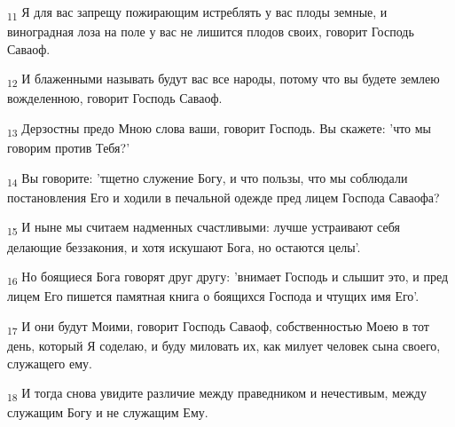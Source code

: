 \begin{tcolorbox}
\textsubscript{11} Я для вас запрещу пожирающим истреблять у вас плоды земные, и виноградная лоза на поле у вас не лишится плодов своих, говорит Господь Саваоф.
\end{tcolorbox}
\begin{tcolorbox}
\textsubscript{12} И блаженными называть будут вас все народы, потому что вы будете землею вожделенною, говорит Господь Саваоф.
\end{tcolorbox}
\begin{tcolorbox}
\textsubscript{13} Дерзостны предо Мною слова ваши, говорит Господь. Вы скажете: 'что мы говорим против Тебя?'
\end{tcolorbox}
\begin{tcolorbox}
\textsubscript{14} Вы говорите: 'тщетно служение Богу, и что пользы, что мы соблюдали постановления Его и ходили в печальной одежде пред лицем Господа Саваофа?
\end{tcolorbox}
\begin{tcolorbox}
\textsubscript{15} И ныне мы считаем надменных счастливыми: лучше устраивают себя делающие беззакония, и хотя искушают Бога, но остаются целы'.
\end{tcolorbox}
\begin{tcolorbox}
\textsubscript{16} Но боящиеся Бога говорят друг другу: 'внимает Господь и слышит это, и пред лицем Его пишется памятная книга о боящихся Господа и чтущих имя Его'.
\end{tcolorbox}
\begin{tcolorbox}
\textsubscript{17} И они будут Моими, говорит Господь Саваоф, собственностью Моею в тот день, который Я соделаю, и буду миловать их, как милует человек сына своего, служащего ему.
\end{tcolorbox}
\begin{tcolorbox}
\textsubscript{18} И тогда снова увидите различие между праведником и нечестивым, между служащим Богу и не служащим Ему.
\end{tcolorbox}
